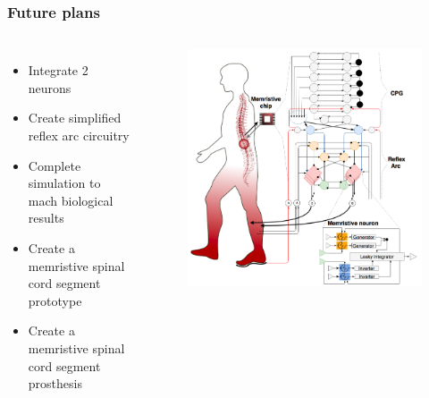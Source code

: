 \documentclass[12pt, aspectratio=169]{beamer}
\begin{document}
\begin{frame}
  \frametitle{Future plans}
\begin{columns}[c]

\begin{itemize}
\item Integrate 2 neurons
\item Create simplified reflex arc circuitry
\item Complete simulation to mach biological results
\item Create a memristive spinal cord segment prototype
\item Create a memristive spinal cord segment prosthesis
\end{itemize}

\begin{figure}
\includegraphics[width=1.0\linewidth]{MemArc_logo}
\end{figure}
\end{columns}
\end{frame}
\end{document}

